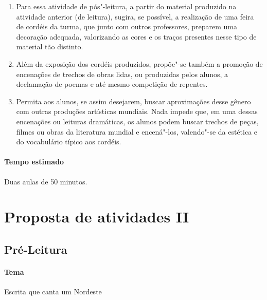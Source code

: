 \documentclass[12pt]{extarticle}
\begin{document}
\begin{enumerate}
\item
Para essa atividade de pós"-leitura, a partir do material produzido na 
atividade anterior (de leitura), sugira, se possível, a realização de 
uma feira de cordéis da turma, que junto com outros professores, preparem 
uma decoração adequada, valorizando as cores e os traços presentes nesse 
tipo de material tão distinto. 

\item
Além da exposição dos cordéis produzidos, propõe"-se também a
promoção de encenações de trechos de obras lidas, ou produzidas pelos
alunos, a declamação de poemas e até mesmo competição de repentes. 

\item
Permita aos alunos, se assim desejarem, buscar aproximações desse gênero 
com outras produções artísticas mundiais. Nada impede que, em uma dessas 
encenações ou leituras dramáticas, os alunos podem buscar trechos de peças, 
filmes ou obras da literatura mundial e encená"-los, valendo"-se da 
estética e do vocabulário típico aos cordéis.

\end{enumerate}

\paragraph{Tempo estimado} Duas aulas de 50 minutos. 

\section{Proposta de atividades II}


\subsection{Pré-Leitura}

\paragraph{Tema} Escrita que canta um Nordeste 
\end{document}
